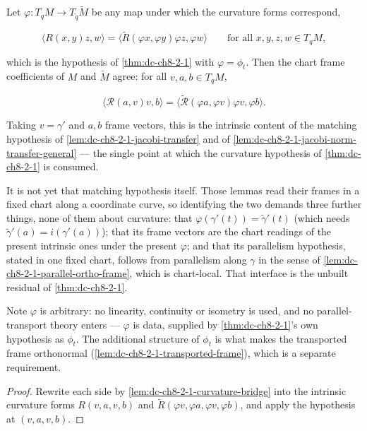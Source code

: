 \begin{lemma}
  \label{lem:dc-ch8-2-1-hmatch-transfer}
  \leanok
  Let $\varphi:T_qM\to T_{\tilde q}\tilde M$ be any map under which the curvature forms
  correspond,

  $$
  \langle R(x,y)z,w\rangle=\big\langle\tilde R(\varphi x,\varphi y)\varphi z,\varphi w\big\rangle
  \qquad\text{for all }x,y,z,w\in T_qM ,
  $$

  which is the hypothesis of \cref{thm:dc-ch8-2-1} with $\varphi=\phi_t$. Then the chart frame
  coefficients of $M$ and $\tilde M$ agree: for all $v,a,b\in T_qM$,

  $$
  \langle\mathcal R(a,v)v,b\rangle=\big\langle\tilde{\mathcal R}(\varphi a,\varphi v)\varphi v,
  \varphi b\big\rangle .
  $$

  Taking $v=\gamma'$ and $a,b$ frame vectors, this is the intrinsic content of the matching
  hypothesis of \cref{lem:dc-ch8-2-1-jacobi-transfer} and of
  \cref{lem:dc-ch8-2-1-jacobi-norm-transfer-general} --- the single point at which the
  curvature hypothesis of \cref{thm:dc-ch8-2-1} is consumed.

  It is not yet that matching hypothesis itself. Those lemmas read
  their frames in a fixed chart along a coordinate curve, so identifying the two demands three
  further things, none of them about curvature: that $\varphi(\gamma'(t))=\tilde\gamma'(t)$
  (which needs $\tilde\gamma'(a)=i(\gamma'(a))$); that its frame vectors are the chart
  readings of the present intrinsic ones under the present $\varphi$; and that its
  parallelism hypothesis, stated in one fixed chart, follows from parallelism along
  $\gamma$ in the sense of \cref{lem:dc-ch8-2-1-parallel-ortho-frame}, which is chart-local.
  That interface is the unbuilt residual of \cref{thm:dc-ch8-2-1}.

  Note $\varphi$ is arbitrary: no linearity, continuity or isometry is used, and no
  parallel-transport theory enters --- $\varphi$ is data, supplied by \cref{thm:dc-ch8-2-1}'s
  own hypothesis as $\phi_t$. The additional structure of $\phi_t$ is what makes the
  transported frame orthonormal (\cref{lem:dc-ch8-2-1-transported-frame}), which is a separate
  requirement.
\end{lemma}
\begin{proof}
  \leanok
\sketch
  Rewrite each side by \cref{lem:dc-ch8-2-1-curvature-bridge} into the intrinsic curvature
  forms $R(v,a,v,b)$ and $\tilde R(\varphi v,\varphi a,\varphi v,\varphi b)$, and apply the
  hypothesis at $(v,a,v,b)$.
\end{proof}

